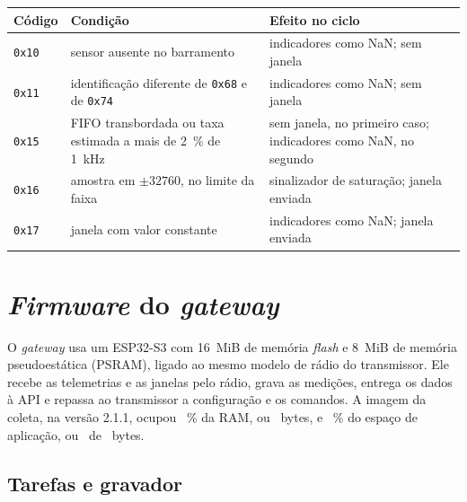 \begin{quadro}[!htb]
\centering\small
\caption{Códigos de diagnóstico da telemetria}\label{quadro:sis-diagnostico}
\begin{tabular}{@{}l>{\raggedright\arraybackslash}p{68mm}>{\raggedright\arraybackslash}p{60mm}@{}}
\toprule
Código & Condição & Efeito no ciclo \\
\midrule
\texttt{0x10} & sensor ausente no barramento & indicadores como NaN; sem janela \\
\texttt{0x11} & identificação diferente de \texttt{0x68} e de \texttt{0x74} & indicadores como NaN; sem janela \\
\texttt{0x15} & FIFO transbordada ou taxa estimada a mais de \SI{2}{\percent} de \SI{1}{\kilo\hertz} & sem janela, no primeiro caso; indicadores como NaN, no segundo \\
\texttt{0x16} & amostra em $\pm\num{32760}$, no limite da faixa & sinalizador de saturação; janela enviada \\
\texttt{0x17} & janela com valor constante & indicadores como NaN; janela enviada \\
\bottomrule
\end{tabular}
\end{quadro}

\section{\textit{Firmware} do \textit{gateway}}\label{sec:sis-gateway}

O \textit{gateway} usa um ESP32-S3 com \SI{16}{MiB} de memória \textit{flash} e \SI{8}{MiB} de memória pseudoestática (PSRAM), ligado ao mesmo modelo de rádio do transmissor. Ele recebe as telemetrias e as janelas pelo rádio, grava as medições, entrega os dados à API e repassa ao transmissor a configuração e os comandos. A imagem da coleta, na versão 2.1.1, ocupou \sisRamGatewayPct~\% da RAM, ou \sisRamGatewayBytes\ bytes, e \sisFlashGatewayPct~\% do espaço de aplicação, ou \sisFlashGatewayBytes\ de \sisFlashGatewayTotal\ bytes.

\subsection{Tarefas e gravador}\label{sec:sis-gravador}

